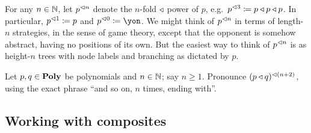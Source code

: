 \documentclass[Book-Poly]{subfiles}
\begin{document}
For any $n\in\mathbb{N}$, let $p^{\lhd n}$ denote the $n$-fold $\mathbin{\triangleleft}$ power of $p$, e.g.\ $p^{\lhd 3}\coloneqq p\mathbin{\triangleleft} p\mathbin{\triangleleft} p$. In particular, $p^{\lhd 1}\coloneqq p$ and $p\tripow{0}\coloneqq\yon$. We might think of $p^{\lhd n}$ in terms of length-$n$ strategies, in the sense of game theory, except that the opponent is somehow abstract, having no positions of its own. But the easiest way to think of $p^{\lhd n}$ is as height-$n$ trees with node labels and branching as dictated by $p$.

\begin{exercise}
Let $p,q\in\mathbf{Poly}$ be polynomials and $n\in\mathbb{N}$; say $n\geq 1$. Pronounce $(p\mathbin{\triangleleft} q)^{\lhd (n+2)}$, using the exact phrase ``and so on, $n$ times, ending with''.
\end{exercise}


\subsection{Working with composites}\label{subsec.working_with_composites}
\end{document}
